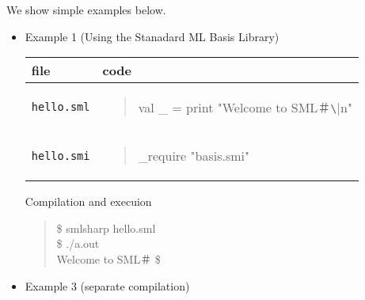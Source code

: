 \documentclass{jbook}
\newcommand{\code}[1]{\mbox{\large\tt #1}}
\newenvironment{program}{\begin{quote}\begin{tt}}%
                        {\end{tt}\end{quote}}
\begin{document}
	We show simple examples below.
\begin{itemize}
\item Example 1 (Using the Stanadard ML Basis Library)

\begin{tabular}{|l|l|}
\hline
file & code
\\\hline
\hline
\begin{minipage}{0.5\textwidth}
\code{hello.sml}
\end{minipage}
&
\begin{minipage}{0.5\textwidth}
\begin{program}
val \_ = print "Welcome to SML＃\verb|\|n"
\end{program}
\end{minipage}
\\\hline
\begin{minipage}{0.5\textwidth}
\code{hello.smi}
\end{minipage}
&
\begin{minipage}{0.5\textwidth}
\begin{program}
\_require "basis.smi"
\end{program}
\end{minipage}
\\\hline
\end{tabular}

Compilation and execuion
\begin{program}
 \$ smlsharp hello.sml\\
 \$ ./a.out\\
 Welcome to SML＃
 \$
\end{program}

\item Example 3 (separate compilation)


\end{itemize}
\end{document}
